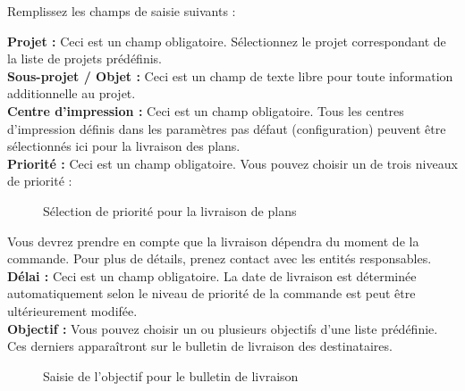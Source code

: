 Remplissez les champs de saisie suivants :

\textbf{Projet :} Ceci est un champ obligatoire. Sélectionnez le projet correspondant de la liste de projets prédéfinis. \\
\textbf{Sous-projet / Objet :} Ceci est un champ de texte libre pour toute information additionnelle au projet. \\
\textbf{Centre d'impression :} Ceci est un champ obligatoire. Tous les centres d'impression définis dans les paramètres pas défaut (configuration) peuvent être sélectionnés ici pour la livraison des plans. \\
\textbf{Priorité :} Ceci est un champ obligatoire. Vous pouvez choisir un de trois niveaux de priorité :
\begin{figure}[H]
\caption{Sélection de priorité pour la livraison de plans}
\end{figure}
Vous devrez prendre en compte que la livraison dépendra du moment de la commande. Pour plus de détails, prenez contact avec les entités responsables. \\
\textbf{Délai :} Ceci est un champ obligatoire. La date de livraison est déterminée automatiquement selon le niveau de priorité de la commande est peut être ultérieurement modifée. \\
\textbf{Objectif :} Vous pouvez choisir un ou plusieurs objectifs d'une liste prédéfinie. Ces derniers apparaîtront sur le bulletin de livraison des destinataires.
\begin{figure}[H]
\caption{Saisie de l'objectif pour le bulletin de livraison}
\end{figure}
